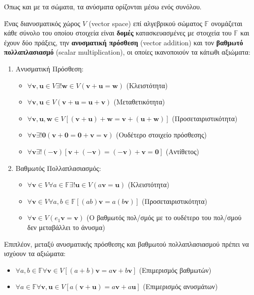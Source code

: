 \documentclass[main.tex]{subfiles}
\begin{document}
	Όπως και με τα σώματα, τα ανύσματα ορίζονται μέσω ενός συνόλου.
	
	\begin{definition}
		Ένας διανυσματικός χώρος $V$ (vector space) επί αλγεβρικού σώματος $\mathbb{F}$ ονομάζεται κάθε σύνολο του οποίου στοιχεία είναι \textbf{δομές} κατασκευασμένες με στοιχεία του $\mathbb{F}$ και έχουν δύο πράξεις, την \textbf{ανυσματική πρόσθεση} (vector addition) και τον \textbf{βαθμωτό πολλαπλασιασμό} (scalar multiplication), οι οποίες ικανοποιούν τα κάτωθι αξιώματα:
		\begin{enumerate}
			\item Ανυσματική Πρόσθεση:
			\begin{itemize}
				\item $\forall\boldsymbol{v},\boldsymbol{u}\in V\exists!\boldsymbol{w}\in V(\boldsymbol{v}+\boldsymbol{u} = \boldsymbol{w})$ (Κλειστότητα)
				\item $\forall\boldsymbol{v},\boldsymbol{u}\in V(\boldsymbol{v} + \boldsymbol{u} = \boldsymbol{u} + \boldsymbol{v})$ (Μεταθετικότητα)
				\item $\forall\boldsymbol{v},\boldsymbol{u},\boldsymbol{w}\in V[(\boldsymbol{v} + \boldsymbol{u}) + \boldsymbol{w} = \boldsymbol{v} + (\boldsymbol{u} + \boldsymbol{w})]$ (Προσεταιριστικότητα)
				\item $\forall\boldsymbol{v}\exists!\boldsymbol{0}(\boldsymbol{v} + \boldsymbol{0} = \boldsymbol{0} + \boldsymbol{v} = \boldsymbol{v})$ (Ουδέτερο στοιχείο πρόσθεσης)
				\item $\forall\boldsymbol{v}\exists!(-\boldsymbol{v})[\boldsymbol{v} + (-\boldsymbol{v}) = (-\boldsymbol{v}) + \boldsymbol{v} = \boldsymbol{0}]$ (Αντίθετος)
			\end{itemize}
			\item Βαθμωτός Πολλαπλασιασμός:
			\begin{itemize}
				\item $\forall\boldsymbol{v}\in V\forall a \in\mathbb{F}\exists!\boldsymbol{u}\in V(a\boldsymbol{v} = \boldsymbol{u})$ (Κλειστότητα)
				\item $\forall\boldsymbol{v}\in V\forall a,b \in\mathbb{F}[(ab)\boldsymbol{v} = a(b\boldsymbol{v})]$ (Προσεταιριστικότητα)
				\item ${\forall\boldsymbol{v}\in V(e_1\boldsymbol{v} = \boldsymbol{v})}$ (Ο βαθμωτός πολ/σμός με το ουδέτερο του πολ/σμού δεν μεταβάλλει το άνυσμα)
			\end{itemize}
		\end{enumerate}
		
		Eπιπλέον, μεταξύ ανυσματικής πρόσθεσης και βαθμωτού πολλαπλασιασμού πρέπει να ισχύουν τα αξιώματα:
		\begin{itemize}
			\item $\forall a, b\in\mathbb{F}\forall\boldsymbol{v}\in V[(a+b)\boldsymbol{v} = a\boldsymbol{v} + b\boldsymbol{v}]$ (Επιμερισμός βαθμωτών)
			\item $\forall a \in\mathbb{F}\forall\boldsymbol{v},\boldsymbol{u}\in V[a(\boldsymbol{v} + \boldsymbol{u}) = a\boldsymbol{v} + a\boldsymbol{u}]$ (Επιμερισμός ανυσμάτων)
		\end{itemize}
	\end{definition}
\end{document}
